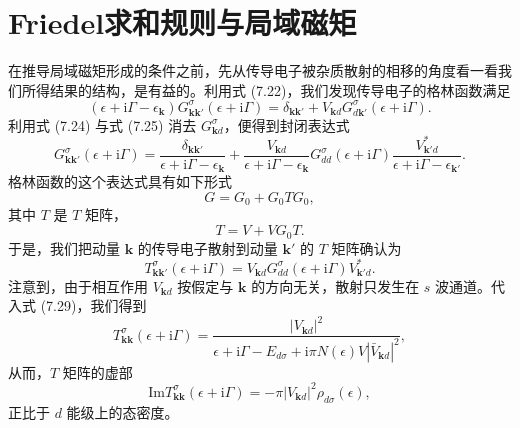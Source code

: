 \section{Friedel求和规则与局域磁矩}

在推导局域磁矩形成的条件之前，先从传导电子被杂质散射的相移的角度看一看我们所得结果的结构，是有益的。利用式 (7.22)，我们发现传导电子的格林函数满足
\begin{equation*}
(\epsilon + \mathrm{i}\Gamma - \epsilon_{\mathbf{k}})G^{\sigma}_{\mathbf{k}\mathbf{k}'}(\epsilon + \mathrm{i}\Gamma) = \delta_{\mathbf{k}\mathbf{k}'} + V_{\mathbf{k}d}G^{\sigma}_{d\mathbf{k}'}(\epsilon + \mathrm{i}\Gamma).
\tag{7.101}
\end{equation*}
利用式 (7.24) 与式 (7.25) 消去 $G^{\sigma}_{\mathbf{k}d}$，便得到封闭表达式
\begin{equation*}
G^{\sigma}_{\mathbf{k}\mathbf{k}'}(\epsilon + \mathrm{i}\Gamma) = \frac{\delta_{\mathbf{k}\mathbf{k}'}}{\epsilon + \mathrm{i}\Gamma - \epsilon_{\mathbf{k}}} + \frac{V_{\mathbf{k}d}}{\epsilon + \mathrm{i}\Gamma - \epsilon_{\mathbf{k}}}G^{\sigma}_{dd}(\epsilon + \mathrm{i}\Gamma)\frac{V^{*}_{\mathbf{k}'d}}{\epsilon + \mathrm{i}\Gamma - \epsilon_{\mathbf{k}'}}.
\tag{7.102}
\end{equation*}
格林函数的这个表达式具有如下形式
\begin{equation*}
G = G_{0} + G_{0}TG_{0},
\tag{7.103}
\end{equation*}
其中 $T$ 是 $T$ 矩阵，
\begin{equation*}
T = V + VG_{0}T.
\tag{7.104}
\end{equation*}
于是，我们把动量 $\mathbf{k}$ 的传导电子散射到动量 $\mathbf{k}'$ 的 $T$ 矩阵确认为
\begin{equation*}
T^{\sigma}_{\mathbf{k}\mathbf{k}'}(\epsilon + \mathrm{i}\Gamma) = V_{\mathbf{k}d}G^{\sigma}_{dd}(\epsilon + \mathrm{i}\Gamma)V^{*}_{\mathbf{k}'d}.
\tag{7.105}
\end{equation*}
注意到，由于相互作用 $V_{\mathbf{k}d}$ 按假定与 $\mathbf{k}$ 的方向无关，散射只发生在 $s$ 波通道。代入式 (7.29)，我们得到
\begin{equation*}
T^{\sigma}_{\mathbf{k}\mathbf{k}}(\epsilon + \mathrm{i}\Gamma) = \frac{|V_{\mathbf{k}d}|^{2}}{\epsilon + \mathrm{i}\Gamma - E_{d\sigma} + \mathrm{i}\pi N(\epsilon)V|\bar{V}_{\mathbf{k}d}|^{2}},
\tag{7.106}
\end{equation*}
从而，$T$ 矩阵的虚部
\begin{equation*}
\mathrm{Im}T^{\sigma}_{\mathbf{k}\mathbf{k}}(\epsilon + \mathrm{i}\Gamma) = -\pi|V_{\mathbf{k}d}|^{2}\rho_{d\sigma}(\epsilon),
\tag{7.107}
\end{equation*}
正比于 $d$ 能级上的态密度。

